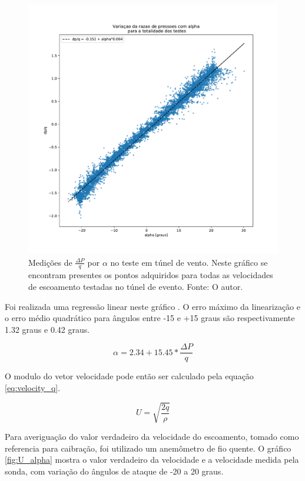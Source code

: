 \begin{figure}[!ht]
    \centering
    \includegraphics[width=.7\linewidth]{figuras/calibracao/dp-q_plot.pdf}
    \caption{Medições de $\frac{\Delta P}{q}$ por $\alpha$ no teste em túnel de vento. Neste gráfico se encontram presentes os pontos adquiridos para todas as velocidades de escoamento testadas no túnel de evento. Fonte: O autor.}
    \label{fig:Deltapq_alpha_plot}
\end{figure}

Foi realizada uma regressão linear neste gráfico \citep{borges2008desenvolvimento}. O erro máximo da linearização e o erro médio quadrático para ângulos entre -15 e +15 graus são respectivamente 1.32 graus e 0.42 graus.

\begin{equation}
    \alpha = 2.34 + 15.45 * \frac{\Delta P}{q}
\end{equation}

O modulo do vetor velocidade pode então ser calculado pela equação \ref{eq:velocity_q}. 

\begin{equation}
    U = \sqrt{\frac{2q}{\rho}}
    \label{eq:velocity_q}
\end{equation}


Para averiguação do valor verdadeiro da velocidade do escoamento, tomado como referencia para caibração, foi utilizado um anemômetro de fio quente. O gráfico \ref{fig:U_alpha} mostra o valor verdadeiro da velocidade e a velocidade medida pela sonda, com variação do ângulos de ataque de -20 a 20 graus.


